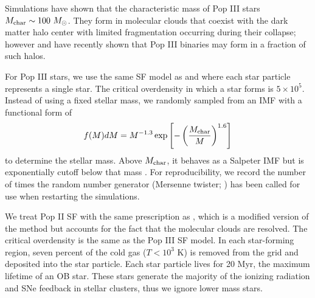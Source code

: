 \documentclass[12pt]{article}
\newcommand{\Ms}{\ifmmode{M_\odot}\else{$M_\odot$}\fi}
\begin{document}
Simulations have shown that the characteristic mass of Pop III stars
$M_{\rm char} \sim 100~\Ms$.  They form in molecular clouds that
coexist with the dark matter halo center with limited fragmentation
occurring during their collapse; however \cite{2009Sci...325..601T}
and \cite{Stacy10_Binary} have recently shown that Pop III binaries
may form in a fraction of such halos.


For Pop III stars, we use the same SF model as \cite{Abel07} and
\cite{Wise08_Gal} where each star particle represents a single star.
The critical overdensity in which a star forms is $5 \times 10^5$.
Instead of using a fixed stellar mass, we randomly sampled from an IMF
with a functional form of
%
\begin{equation}
\label{eqn:imf}
f(M)dM = M^{-1.3} \exp\left[-\left(\frac{M_{\rm char}}{M}\right)^{1.6}\right]
\end{equation}
to determine the stellar mass.  Above $M_{\rm char}$, it behaves as a
Salpeter IMF but is exponentially cutoff below that mass
\cite{Chabrier03, Clark09}.  For reproducibility, we record the
number of times the random number generator (Mersenne twister; \cite{MTwister})
has been called for use when restarting the simulations.

%

We treat Pop II SF with the same prescription as \cite{Wise09}, which
is a modified version of the \cite{Cen92} method but accounts for the
fact that the molecular clouds are resolved.  The critical overdensity
is the same as the Pop III SF model.  In each star-forming region,
seven percent of the cold gas ($T < 10^3$ K) is removed from the grid
and deposited into the star particle.  Each star particle lives for 20
Myr, the maximum lifetime of an OB star.  These stars generate the
majority of the ionizing radiation and SNe feedback in stellar
clusters, thus we ignore lower mass stars.
\end{document}
